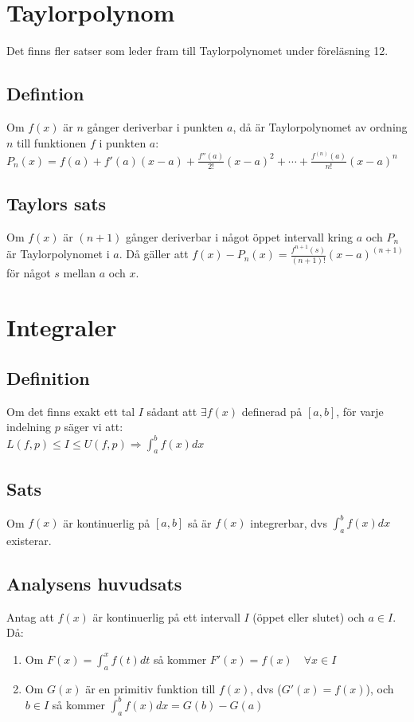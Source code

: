 \documentclass{article}
\begin{document}
\newpage
\section{Taylorpolynom}
Det finns fler satser som leder fram till Taylorpolynomet under föreläsning 12.
\subsection{Defintion}
Om $f(x)$ är $n$ gånger deriverbar i punkten $a$, då är Taylorpolynomet av ordning $n$ till funktionen $f$ i punkten $a$:\\
$P_{n}(x)=f(a)+f'(a)(x-a)+\frac{f''(a)}{2!}(x-a)^2+\cdots+\frac{f^{(n)}(a)}{n!}(x-a)^n$

\subsection{Taylors sats}
Om $f(x)$ är $(n+1)$ gånger deriverbar i något öppet intervall kring $a$ och $P_{n}$ är Taylorpolynomet i $a$. Då gäller att $f(x)-P_{n}(x)=\frac{f^{n+1}(s)}{(n+1)!}(x-a)^{(n+1)}$ för något $s$ mellan $a$ och $x$.

\section{Integraler}
\subsection{Definition}
Om det finns exakt ett tal $I$ sådant att $\exists f(x)$ definerad på $[a,b]$, för varje indelning $p$ säger vi att:\\
${\displaystyle L(f,p)\leq I \leq U(f,p) \Rightarrow \int_{a}^{b}f(x)dx}$

\subsection{Sats}
Om $f(x)$ är kontinuerlig på $[a,b]$ så är $f(x)$ integrerbar, dvs ${\displaystyle\int_{a}^{b}f(x)dx}$ existerar.

\subsection{Analysens huvudsats}
Antag att $f(x)$ är kontinuerlig på ett intervall $I$ (öppet eller slutet) och $a\in I$. Då:
\begin{enumerate}
   \item Om ${\displaystyle F(x)=\int_{a}^{x}f(t)dt}$ så kommer $F'(x)=f(x)\quad \forall x\in I$
   \item Om $G(x)$ är en primitiv funktion till $f(x)$, dvs ($G'(x)=f(x)$), och $b\in I$ så kommer ${\displaystyle\int_{a}^{b}f(x)dx=G(b)-G(a)}$
\end{enumerate}
\end{document}
